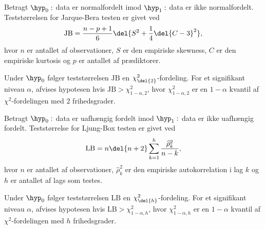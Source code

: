 \begin{defn} \label{def:jbtest}
Betragt \(\hyp_0: \) data er normalfordelt imod \(\hyp_1:\) data er ikke normalfordelt.
Teststørrelsen for Jarque-Bera testen er givet ved
\begin{align*}
\text{JB} = \frac{n-p+1}{6} \del{S^2 + \frac{1}{4} \del{C-3}^2},
\end{align*}
hvor \(n\) er antallet af observationer, \(S\) er den empiriske skewness, \(C\) er den empiriske kurtosis og \(p\) er antallet af prædiktorer.
\end{defn}
Under \(\hyp_0\) følger teststørrelsen \(\text{JB}\) en \(\chi_{\del{2}}^2\)-fordeling.
For et signifikant niveau \(\alpha\), afvises hypotesen hvis \(\text{JB} > \chi_{1-\alpha,2}^2\), hvor \(\chi_{1-\alpha,2}^2\) er en \(1 - \alpha\) kvantil af \(\chi^2\)-fordelingen med \(2\) frihedsgrader.

\begin{defn} \label{def:lbtest}
Betragt \(\hyp_0 :\) data er uafhængig fordelt imod \(\hyp_1 :\) data er ikke uafhængig fordelt.
Teststørrelse for Ljung-Box testen er givet ved
\begin{align*}
\text{LB} = n \del{n +2} \sum_{k=1}^h \frac{\widehat{\rho}_k^2}{n-k},
\end{align*}
hvor \(n\) er antallet af observationer, \(\widehat{\rho}_k^2\) er den empiriske autokorrelation i lag \(k\) og \(h\) er antallet af lags som testes.
\end{defn}
Under \(\hyp_0\) følger teststørrelsen \(\text{LB}\) en \(\chi_{\del{h}}^2\)-fordeling.
For et signifikant niveau \(\alpha\), afvises hypotesen hvis \(\text{LB} > \chi_{1-\alpha,h}^2\), hvor \(\chi_{1-\alpha,h}^2\) er en \(1 - \alpha\) kvantil af \(\chi^2\)-fordelingen med \(h\) frihedsgrader.


